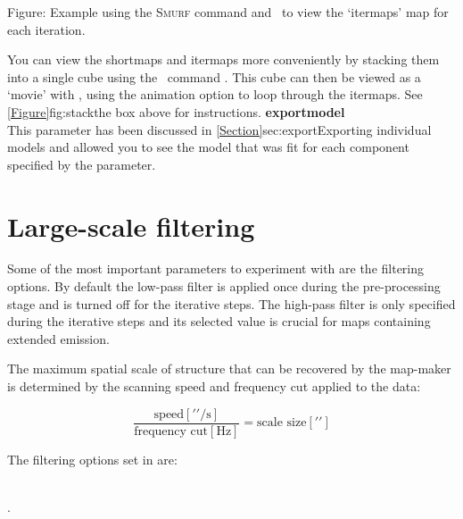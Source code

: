 \documentclass[11pt,oneside,chapters]{starlink}
\begin{document}
\begin{htmlonly}
\label{fig:stack} 
Figure: Example using the \textsc{Smurf} command  and
\gaia\ to view the `itermaps' map for each iteration.
\end{htmlonly}

\begin{terminalv}
\end{terminalv}

You can view the shortmaps and itermaps more
conveniently by stacking them into a single cube using the \smurf\
command \stackframes. This cube can then be viewed as a
`movie' with \gaia, using the animation option to loop through the
itermaps. See \cref{Figure}{fig:stack}{the box above} for instructions.
\newline\newline
\textbf{exportmodel}\\
This parameter has been discussed in
\cref{Section}{sec:export}{Exporting individual models} and allowed
you to see the model that was fit for each component specified by the
\param{modelorder} parameter.

\section{Large-scale filtering}
\label{sec:filt}

Some of the most important parameters to experiment with are the
filtering options. By default the low-pass filter is applied once
during the pre-processing stage and is turned off for the iterative
steps. The high-pass filter is only specified during the iterative
steps and its selected value is crucial for maps containing extended
emission.

The maximum spatial scale of structure that can be recovered by the
map-maker is determined by the scanning speed and frequency cut
applied to the data:

\begin{equation}
\frac{\textrm{speed}[\prime\prime / \textrm{s}]}{\textrm{frequency
    cut}[\textrm{Hz}]}=\textrm{scale size}[\prime\prime]
\end{equation}

The filtering options set in  are:

 \\
.
\end{document}
